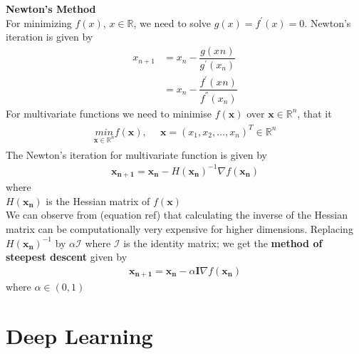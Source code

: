 \vspace{5mm}
\noindent\textbf{Newton's Method}\\
For minimizing $f(x)$, $x \in \mathbb{R}$, we need to solve $g(x) = f^{'}(x)=0$. Newton's iteration is given by 
\begin{align}
  x_{n+1} &= x_{n} - \dfrac{g(x_{}n)}{g^{'}(x_n)} \\
          &= x_{n} - \dfrac{f^{'}(x_{}n)}{f^{''}(x_n)}
\end{align}
For multivariate functions we need to minimise $f(\mathbf{x})$ over $\mathbf{x} \in \mathbb{R}^n$, that it
\begin{align}
  \begin{matrix}
    \underset{\mathbf{x}\in\mathbb{R}^n}{min} f(\mathbf{x}), & \,\,\, \mathbf{x} =(x_1,x_2,\dots,x_n)^T \in \mathbb{R}^n
  \end{matrix} 
\end{align}
The Newton's iteration for multivariate function is given by
\begin{align}
  \mathbf{x_{n+1}} = \mathbf{x_{n}} - H(\mathbf{x_n})^{-1}\nabla f(\mathbf{x_n})
\end{align}
where\\
\indent $H(\mathbf{x_n})$ is the Hessian matrix of $f(\mathbf{x})$\\
\noindent We can observe from (equation ref) that calculating the inverse of the Hessian matrix can be computationally very expensive for higher dimensions. Replacing $H(\mathbf{x_n})^{-1}$ by $\alpha \mathcal{I}$ where $\mathcal{I}$ is the identity matrix; we get the \textbf{method of steepest descent} given by
\begin{align}
  \mathbf{x_{n+1}} = \mathbf{x_{n}} - \alpha \textbf{I} \nabla f(\mathbf{x_n})
\end{align}
where $\alpha \in (0,1)$ 
\section{Deep Learning}
